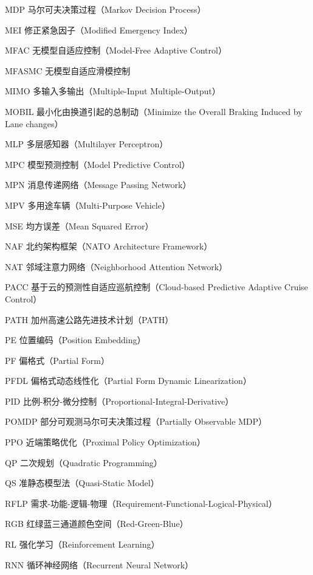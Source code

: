 \begin{denotation}[3cm]
  \item[MDP] 马尔可夫决策过程（Markov Decision Process）
  \item[MEI] 修正紧急因子（Modified Emergency Index）
  \item[MFAC] 无模型自适应控制（Model-Free Adaptive Control）
  \item[MFASMC] 无模型自适应滑模控制
  \item[MIMO] 多输入多输出（Multiple-Input Multiple-Output）
  \item[MOBIL] 最小化由换道引起的总制动（Minimize the Overall Braking Induced by Lane changes）
  \item[MLP] 多层感知器（Multilayer Perceptron）
  \item[MPC] 模型预测控制（Model Predictive Control）
  \item[MPN] 消息传递网络（Message Passing Network）
  \item[MPV] 多用途车辆（Multi-Purpose Vehicle）
  \item[MSE] 均方误差（Mean Squared Error）
  \item[NAF] 北约架构框架（NATO Architecture Framework）
  \item[NAT] 邻域注意力网络（Neighborhood Attention Network）
  \item[PACC] 基于云的预测性自适应巡航控制（Cloud-based Predictive Adaptive Cruise Control）
  \item[PATH] 加州高速公路先进技术计划（PATH）
  \item[PE] 位置编码（Position Embedding）
  \item[PF] 偏格式（Partial Form）
  \item[PFDL] 偏格式动态线性化（Partial Form Dynamic Linearization）
  \item[PID] 比例-积分-微分控制（Proportional-Integral-Derivative）
  \item[POMDP] 部分可观测马尔可夫决策过程（Partially Observable MDP）
  \item[PPO] 近端策略优化（Proximal Policy Optimization）
  \item[QP] 二次规划（Quadratic Programming）
  \item[QS] 准静态模型法（Quasi-Static Model）
  \item[RFLP] 需求-功能-逻辑-物理（Requirement-Functional-Logical-Physical）
  \item[RGB] 红绿蓝三通道颜色空间（Red-Green-Blue）
  \item[RL] 强化学习（Reinforcement Learning）
  \item[RNN] 循环神经网络（Recurrent Neural Network）

\end{denotation}
